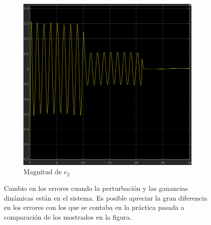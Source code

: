 \documentclass[12pt, letterpaper]{article}
\begin{document}
\begin{figure}[H]
\begin{subfigure}[b]{0.49\linewidth}
		\includegraphics[width=\linewidth]{e2.png}
		\caption{Magnitud de $e_2$}
	\end{subfigure}
	\caption{Cambio en los errores cuando la perturbación y las ganancias dinámicas están en el sistema. Es posible apreciar la gran diferencia en los errores con los que se contaba en la práctica pasada a comparación de los mostrados en la figura.}
\end{figure}

\renewcommand\refname{Referencias}
\printbibliography
\end{document}
